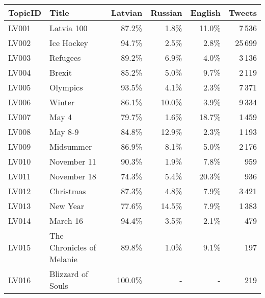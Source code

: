 \begin{tabular}{llrrrr}
\toprule
TopicID & Title & Latvian & Russian & English & Tweets \\
\midrule
LV001    & Latvia 100 &  87.2\% &  1.8\% & 11.0\% &   7\,536 \\
LV002    & Ice Hockey & 94.7\% &  2.5\% &  2.8\% &  25\,699 \\
LV003    & Refugees & 89.2\% &  6.9\% &  4.0\% &   3\,136 \\
LV004    & Brexit & 85.2\% &  5.0\% &  9.7\% &   2\,119 \\
LV005    & Olympics & 93.5\% &  4.1\% &  2.3\% &   7\,371 \\
LV006    & Winter & 86.1\% & 10.0\% &  3.9\% &   9\,334 \\
LV007    & May 4 & 79.7\% &  1.6\% & 18.7\% &   1\,459 \\
LV008    & May 8-9 & 84.8\% & 12.9\% &  2.3\% &   1\,193 \\
LV009    & Midsummer & 86.9\% &  8.1\% &  5.0\% &   2\,176 \\
LV010    & November 11 & 90.3\% &  1.9\% &  7.8\% &    959 \\
LV011    & November 18 & 74.3\% &  5.4\% & 20.3\% &    936 \\
LV012    & Christmas & 87.3\% &  4.8\% &  7.9\% &   3\,421 \\
LV013    & New Year & 77.6\% & 14.5\% &  7.9\% &   1\,383 \\
LV014    & March 16 & 94.4\% &  3.5\% &  2.1\% &    479 \\
LV015    & The Chronicles of Melanie & 89.8\% &  1.0\% &  9.1\% &    197 \\
LV016    & Blizzard of Souls & 100.0\% &  - &  - &    219 \\
\bottomrule
\end{tabular}
